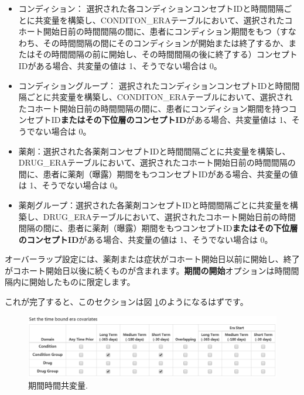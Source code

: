 \documentclass[
  11pt]{book}
\theoremstyle{definition}
\theoremstyle{definition}
\theoremstyle{definition}
\theoremstyle{definition}
\theoremstyle{remark}
\begin{document}
\begin{itemize}
\item
  コンディション： 選択された各コンディションコンセプトIDと時間間隔ごとに共変量を構築し、CONDITON\_ERAテーブルにおいて、選択されたコホート開始日前の時間間隔の間に、患者にコンディション期間をもつ（すなわち、その時間間隔の間にそのコンディションが開始または終了するか、またはその時間間隔の前に開始し、その時間間隔の後に終了する）コンセプトIDがある場合、共変量の値は 1、そうでない場合は 0。
\item
  コンディショングループ： 選択されたコンディションコンセプトIDと時間間隔ごとに共変量を構築し、CONDITON\_ERAテーブルにおいて、選択されたコホート開始日前の時間間隔の間に、患者にコンディション期間を持つコンセプトID\textbf{またはその下位層のコンセプトID}がある場合、共変量値は 1、そうでない場合は 0。
\item
  薬剤：選択された各薬剤コンセプトIDと時間間隔ごとに共変量を構築し、DRUG\_ERAテーブルにおいて、選択されたコホート開始日前の時間間隔の間に、患者に薬剤（曝露）期間をもつコンセプトIDがある場合、共変量の値は 1、そうでない場合は 0。
\item
  薬剤グループ：選択された各薬剤コンセプトIDと時間間隔ごとに共変量を構築し、DRUG\_ERAテーブルにおいて、選択されたコホート開始日前の時間間隔の間に、患者に薬剤（曝露）期間をもつコンセプトID\textbf{またはその下位層のコンセプトID}がある場合、共変量の値は 1、そうでない場合は 0。
\end{itemize}

オーバーラップ設定には、薬剤または症状がコホート開始日以前に開始し、終了がコホート開始日以後に続くものが含まれます。\textbf{期間の開始}オプションは時間間隔内に開始したものに限定します。

これが完了すると、このセクションは図 \ref{fig:covariateSettings4}のようになるはずです。

\begin{figure}

{\centering \includegraphics[width=1\linewidth]{images/PatientLevelPrediction/covariateSettings4} 

}

\caption{期間時間共変量.}\label{fig:covariateSettings4}
\end{figure}
\end{document}
